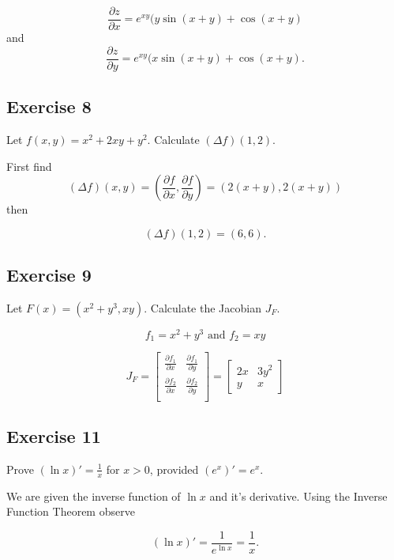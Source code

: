 \documentclass{tufte-book}
\newcommand{\pdv}[2]{\frac{\partial #1}{\partial #2}}
\theoremstyle{mytheoremstyle}
\theoremstyle{mylemstyle}
\theoremstyle{mydefstyle}
\begin{document}
\[ \pdv{z}{x} = e^{xy}(y \sin(x+y) + \cos(x+y) \]
and
\[ \pdv{z}{y} = e^{xy}(x \sin(x+y) + \cos(x+y). \]

\subsection{Exercise 8}
Let $f(x,y) = x^2 + 2xy + y^2$.  Calculate $(\Delta f)(1,2)$.

First find
\[ (\Delta f)(x,y) = (\pdv{f}{x}, \pdv{f}{y}) = (2(x+y), 2(x+y)) \]
then

\[ (\Delta f)(1,2) = (6,6). \]

\subsection{Exercise 9}

Let $F(x) = (x^2+y^3, xy)$.  Calculate the Jacobian $J_F$.

\[ f_1 = x^2 + y^3 \text{ and } f_2=xy \]

\[ J_F =
\begin{bmatrix}
\pdv{f_1}{x} & \pdv{f_1}{y} \\
\pdv{f_2}{x} & \pdv{f_2}{y} \\
\end{bmatrix}
=
\begin{bmatrix}
2x & 3y^2 \\
y & x
\end{bmatrix}
\]

\subsection{Exercise  11}
Prove $(\ln x)'=\frac{1}{x}$ for $x > 0$, provided $(e^x)'=e^x$.

We are given the inverse function of $\ln x$ and it's derivative.  Using the Inverse Function Theorem observe

\[ (\ln x)' = \frac{1}{e^{\ln x}} = \frac{1}{x}. \]
\end{document}

